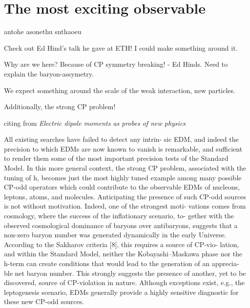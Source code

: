 \chapter{The most exciting observable}
\label{ch:nedm-at-psi}

antohe asonethu snthaoeu

Check out Ed Hind's talk he gave at ETH! I could make something around it.

Why are we here? Because of CP symmetry breaking! - Ed Hinds.
Need to explain the baryon-assymetry.

We expect something around the scale of the weak interaction, new particles.


Additionally, the strong CP problem!


citing from \emph{Electric dipole moments as probes of new physics}

All existing searches have failed to detect any intrin- sic EDM, and indeed the precision to which EDMs are now known to vanish is remarkable, and sufficient to render them some of the most important precision tests of the Standard Model. In this more general context, the strong CP problem, associated with the tuning of h, becomes just the most highly tuned example among many possible CP-odd operators which could contribute to the observable EDMs of nucleons, leptons, atoms, and molecules. Anticipating the presence of such CP-odd sources is not without motivation. Indeed, one of the strongest moti- vations comes from cosmology, where the success of the inflationary scenario, to- gether with the observed cosmological dominance of baryons over antibaryons, suggests that a non-zero baryon number was generated dynamically in the early Universe. According to the Sakharov criteria [8], this requires a source of CP-vio- lation, and within the Standard Model, neither the Kobayashi–Maskawa phase nor the h-term can create conditions that would lead to the generation of an apprecia- ble net baryon number. This strongly suggests the presence of another, yet to be discovered, source of CP-violation in nature. Although exceptions exist, e.g., the leptogenesis scenario, EDMs generally provide a highly sensitive diagnostic for these new CP-odd sources.